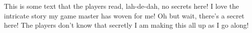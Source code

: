 			\begin{RpgSecret}{This is some text that the players read, lah-de-dah, no secrets here! I love the intricate story my game master has woven for me!}
				Oh but wait, there's a secret here! The players don't know that secretly I am making this all up as I go along!
			\end{RpgSecret}















